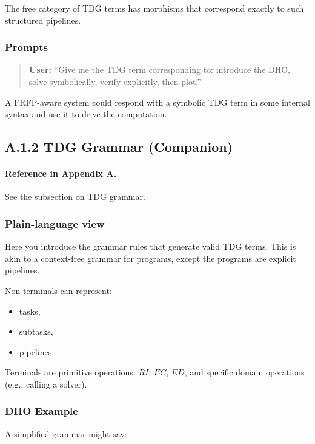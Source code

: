 The free category of TDG terms has morphisms that correspond exactly to such structured pipelines.

\subsubsection*{Prompts}

\begin{quote}
\textbf{User:} 
``Give me the TDG term corresponding to: introduce the DHO, solve symbolically, verify explicitly, then plot.'' 
\end{quote}

A FRFP-aware system could respond with a symbolic TDG term in some internal syntax and use it to
drive the computation.

\newpage

\subsection{A.1.2 TDG Grammar (Companion)}

\paragraph{Reference in Appendix A.}
See the subsection on TDG grammar.

\subsubsection*{Plain-language view}

Here you introduce the grammar rules that generate valid TDG terms. This is akin to a
context-free grammar for programs, except the programs are explicit pipelines.

Non-terminals can represent:

\begin{itemize}
 \item tasks,
 \item subtasks,
 \item pipelines.
\end{itemize}

Terminals are primitive operations: $RI$, $EC$, $ED$, and specific domain operations (e.g., calling a
solver).

\subsubsection*{DHO Example}

A simplified grammar might say:

